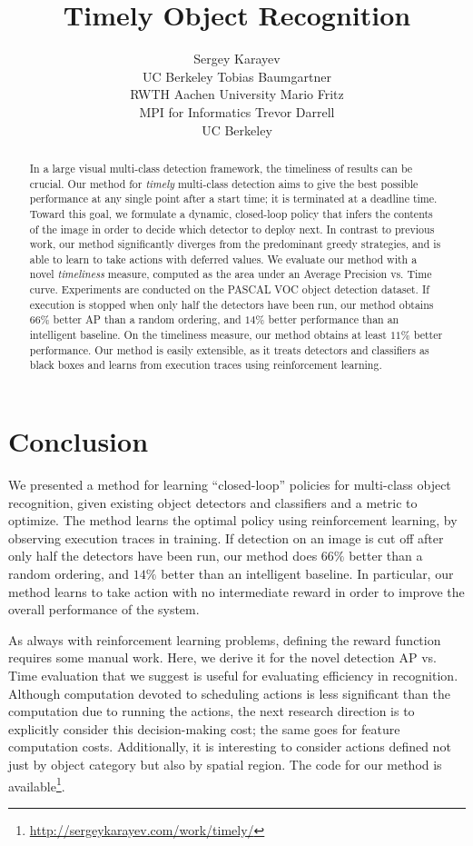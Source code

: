 \documentclass{article} %
\title{Timely Object Recognition}
\author{
Sergey Karayev \\
UC Berkeley
\And
Tobias Baumgartner \\
RWTH Aachen University
\And
Mario Fritz \\
MPI for Informatics 
\And
Trevor Darrell \\
UC Berkeley
}
\begin{document}
\maketitle

\begin{abstract}
In a large visual multi-class detection framework, the timeliness of results can be crucial.
Our method for \emph{timely} multi-class detection aims to give the best possible performance at any single point after a start time; it is terminated at a deadline time.
Toward this goal, we formulate a dynamic, closed-loop policy that infers the contents of the image in order to decide which detector to deploy next.
In contrast to previous work, our method significantly diverges from the predominant greedy strategies, and is able to learn to take actions with deferred values.
We evaluate our method with a novel \emph{timeliness} measure, computed as the area under an Average Precision vs. Time curve.
Experiments are conducted on the PASCAL VOC object detection dataset.
If execution is stopped when only half the detectors have been run, our method obtains $66\%$ better AP than a random ordering, and $14\%$ better performance than an intelligent baseline.
On the timeliness measure, our method obtains at least $11\%$ better performance.
Our method is easily extensible, as it treats detectors and classifiers as black boxes and learns from execution traces using reinforcement learning.
\end{abstract}






\section{Conclusion}
We presented a method for learning ``closed-loop'' policies for multi-class object recognition, given existing object detectors and classifiers and a metric to optimize.
The method learns the optimal policy using reinforcement learning, by observing execution traces in training.
If detection on an image is cut off after only half the detectors have been run, our method does $66\%$ better than a random ordering, and $14\%$ better than an intelligent baseline.
In particular, our method learns to take action with no intermediate reward in order to improve the overall performance of the system.

As always with reinforcement learning problems, defining the reward function requires some manual work.
Here, we derive it for the novel detection AP vs. Time evaluation that we suggest is useful for evaluating efficiency in recognition.
Although computation devoted to scheduling actions is less significant than the computation due to running the actions, the next research direction is to explicitly consider this decision-making cost; the same goes for feature computation costs.
Additionally, it is interesting to consider actions defined not just by object category but also by spatial region.
The code for our method is available\footnote{\url{http://sergeykarayev.com/work/timely/}}.
\end{document}
